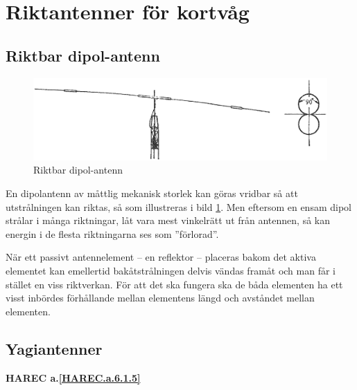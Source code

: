 \section{Riktantenner för kortvåg}

\subsection{Riktbar dipol-antenn}

\begin{figure}
  \includegraphics[width=\textwidth]{images/cropped_pdfs/bild_2_6-17.pdf}
  \caption{Riktbar dipol-antenn}
  \label{fig:bildII6-17}
\end{figure}

En dipolantenn av måttlig mekanisk storlek kan göras vridbar så att
utstrålningen kan riktas, så som illustreras i bild \ref{fig:bildII6-17}.
Men eftersom en ensam dipol strålar i många riktningar, låt vara mest vinkelrätt
ut från antennen, så kan energin i de flesta riktningarna ses som ''förlorad''.

När ett passivt antennelement -- en reflektor -- placeras bakom det aktiva
elementet kan emellertid bakåtstrålningen delvis vändas framåt och man får i
stället en viss riktverkan.
För att det ska fungera ska de båda elementen ha ett visst inbördes förhållande
mellan elementens längd och avståndet mellan elementen.


\subsection{Yagiantenner}
\textbf{
HAREC a.\ref{HAREC.a.6.1.5}\label{myHAREC.a.6.1.5}
}

